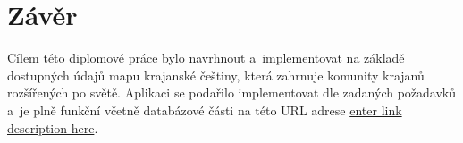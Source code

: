 \hypertarget{zuxe1vux11br}{%
\chapter*{Závěr}\label{zaver}}

Cílem této diplomové práce bylo navrhnout a~implementovat na základě dostupných údajů mapu krajanské češtiny, která zahrnuje komunity krajanů rozšířených po světě. Aplikaci se podařilo implementovat dle zadaných požadavků a~je plně funkční včetně databázové části na této URL adrese \href{https://czech-map.netlify.app/}{enter link description here}.

